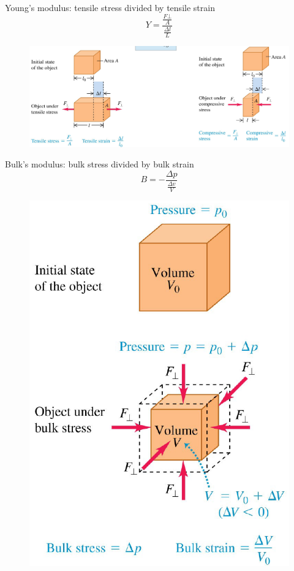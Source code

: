 \documentclass{beamer}
\begin{document}
\begin{frame}
  \begin{block}{Young's modulus: tensile stress divided by tensile strain}
    $$Y = \frac{\frac{F\bot }{A}}{\frac{\Delta l}{L}}$$
  \end{block}
  \begin{figure}[htbp]
  \centering
  \includegraphics[width=1 \linewidth, angle =0]{y's.png}
  \label{fig:y's}
  \end{figure}
\end{frame}

\begin{frame}
  \begin{block}{Bulk's modulus: bulk stress divided by bulk strain}
    $$B=-\frac{\Delta p}{\frac{\Delta v}{V}}$$
  \end{block}
  \begin{figure}[htbp]
  \centering
  \includegraphics[width=0.4 \linewidth, angle =0]{b's.png}
  \label{fig:b's}
  \end{figure}
\end{frame}
\end{document}
